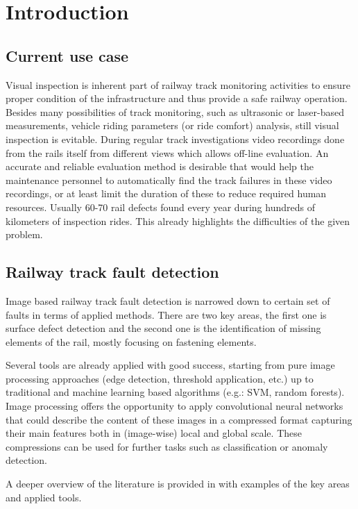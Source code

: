 \section{Introduction}
\subsection{Current use case}
Visual inspection is inherent part of railway track monitoring activities to ensure proper
condition of the infrastructure and thus provide a safe railway operation.
Besides many possibilities of track monitoring, such as ultrasonic or laser-based measurements,
vehicle riding parameters (or ride comfort) analysis, still visual inspection is evitable.
During regular track investigations video recordings done from the rails itself from different
views which allows off-line evaluation.
An accurate and reliable evaluation method is desirable that would help the maintenance personnel
to automatically find the track failures in these video recordings, or at least limit the duration
of these to reduce required human resources.
Usually 60-70 rail defects found every year during hundreds of kilometers of inspection rides.
This already highlights the difficulties of the given problem.

\subsection{Railway track fault detection}
Image based railway track fault detection is narrowed down to certain set of faults in terms of applied methods.
There are two key areas, the first one is surface defect detection and the second one is the
identification of missing elements of the rail, mostly focusing on fastening elements.

Several tools are already applied with good success, starting from pure image processing approaches
(edge detection, threshold application, etc.) up to traditional and machine learning based algorithms
(e.g.: SVM, random forests).
Image processing offers the opportunity to apply convolutional neural networks that could describe
the content of these images in a compressed format capturing their main features both in (image-wise)
local and global scale.
These compressions can be used for further tasks such as classification or anomaly detection.

A deeper overview of the literature is provided in \cite{tomcom_mathemathical_2022} with examples
of the key areas and applied tools.

